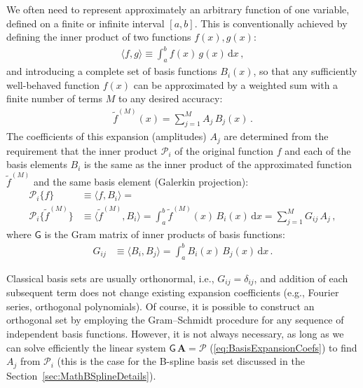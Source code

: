\documentclass[12pt]{article}
\renewcommand{\d}{\mathrm{d}}
\begin{document}
We often need to represent approximately an arbitrary function of one variable, defined on a finite or infinite interval $[a,b]$.
This is conventionally achieved by defining the inner product of two functions $f(x), g(x)$:
\begin{align}  \label{eq:InnerProduct}
\langle f, g \rangle \equiv \int_a^b f(x)\, g(x)\, \d x \,,
\end{align}
and introducing a complete set of basis functions $B_i(x)$, so that any sufficiently well-behaved function $f(x)$ can be approximated by a weighted sum with a finite number of terms $M$ to any desired accuracy:
\begin{align}  \label{eq:BasisApproximation}
\tilde f^{(M)}(x) = \sum_{j=1}^M A_j\,B_j(x) \,.
\end{align}
The coefficients of this expansion (amplitudes) $A_j$ are determined from the requirement that the inner product $\mathcal P_i$ of the original function $f$ and each of the basis elements $B_i$ is the same as the inner product of the approximated function $\tilde f^{(M)}$ and the same basis element (Galerkin projection):
\begin{subequations}  \label{eq:BasisExpansionCoefs}
\begin{align}
\mathcal P_i \{f\} &\equiv \langle f, B_i \rangle = \\
\mathcal P_i \{\tilde f^{(M)}\} &\equiv \langle \tilde f^{(M)}, B_i \rangle =
\int_a^b \tilde f^{(M)}(x)\, B_i(x)\, \d x = \sum_{j=1}^M G_{ij}\, A_j  \,,
\end{align}
\end{subequations}
where $\mathsf G$ is the Gram matrix of inner products of basis functions:
\begin{align}  \label{eq:BasisExpansionMatrix}
G_{ij} &\equiv \langle B_i, B_j \rangle  =  \int_a^b B_i(x)\,B_j(x)\,\d x \,.
\end{align}

Classical basis sets are usually orthonormal, i.e., $G_{ij} = \delta_{ij}$, and addition of each subsequent term does not change existing expansion coefficients (e.g., Fourier series, orthogonal polynomials). Of course, it is possible to construct an orthogonal set by employing the Gram--Schmidt procedure for any sequence of independent basis functions. However, it is not always necessary, as long as we can solve efficiently the linear system $\mathsf G\,\boldsymbol A = \boldsymbol{\mathcal P}$ (\ref{eq:BasisExpansionCoefs}) to find $A_j$ from $\mathcal P_i$ (this is the case for the B-spline basis set discussed in the Section~\ref{sec:MathBSplineDetails}).
\end{document}
